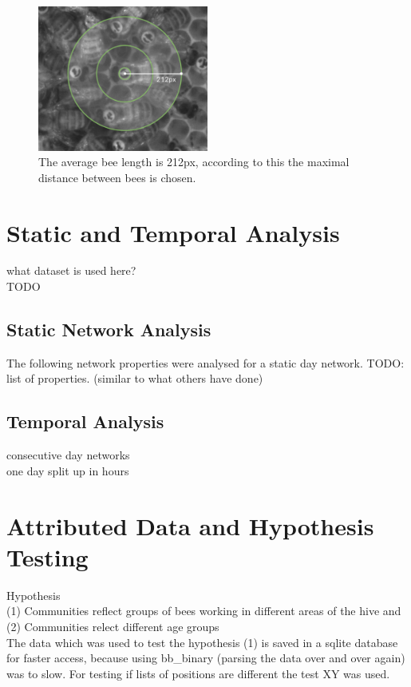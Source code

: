 \begin{figure}[htb]
	\centering
	\includegraphics[width=0.5\textwidth]{Figures/radius}
	\caption[Distance Between Bees]{The average bee length is 212px, according to this the maximal distance between bees is chosen.}
	\label{fig:radius}
\end{figure}

\section{Static and Temporal Analysis}
what dataset is used here?\\
TODO\\

\subsection{Static Network Analysis}
The following network properties were analysed for a static day network.
TODO: list of properties. (similar to what others have done)

\subsection{Temporal Analysis}
consecutive day networks\\
one day split up in hours\\

\section{Attributed Data and Hypothesis Testing}
Hypothesis\\
(1) Communities reflect groups of bees working in different areas of the hive and\\ (2) Communities relect different age groups\\

The data which was used to test the hypothesis (1) is saved in a sqlite database for faster access, because using bb\_binary (parsing the data over and over again) was to slow. For testing if lists of positions are different the test XY was used.

